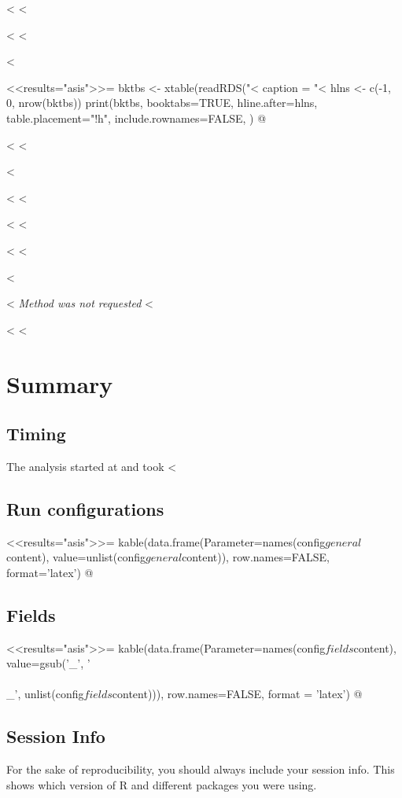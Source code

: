 \documentclass[a4,oneside,garamond,11.5pt]{scrartcl}
\begin{document}
{{{{{{<%
<%


<%
<%

<%

<<results="asis">>=
bktbs <- xtable(readRDS("<%
caption = "<%
hlns <- c(-1, 0, nrow(bktbs))
print(bktbs, booktabs=TRUE, hline.after=hlns, table.placement="!h", include.rownames=FALSE, 
)
@
\FloatBarrier

<%
<%

<%


<%
<%

<%
<%

<%
<%

<%

<%
\textit{Method was not requested}
<%


<%
<%


\section{Summary}
\subsection{Timing}
The analysis started at and took <%

\subsection{Run configurations}

<<results="asis">>=
kable(data.frame(Parameter=names(config$general$content), value=unlist(config$general$content)), row.names=FALSE, format='latex')
@

\subsection{Fields}

<<results="asis">>=
kable(data.frame(Parameter=names(config$fields$content), value=gsub('_', '\\\\_', unlist(config$fields$content))), row.names=FALSE, format = 'latex')
@

\subsection{Session Info}
For the sake of reproducibility, you should always include your session info. This shows which version of R and different packages you were using. 

}}}}}}
\end{document}
